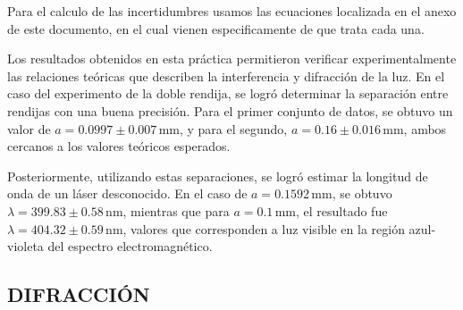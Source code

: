 \documentclass[article,12pt]{elsarticle}
\begin{document}
Para el calculo de las incertidumbres usamos las ecuaciones localizada en el anexo de este documento, en el cual vienen especificamente de que trata cada una.

Los resultados obtenidos en esta práctica permitieron verificar experimentalmente las relaciones teóricas que describen la interferencia y difracción de la luz. En el caso del experimento de la doble rendija, se logró determinar la separación entre rendijas con una buena precisión. Para el primer conjunto de datos, se obtuvo un valor de $a = 0.0997 \pm 0.007\, \text{mm}$, y para el segundo, $a = 0.16 \pm 0.016\, \text{mm}$, ambos cercanos a los valores teóricos esperados.

Posteriormente, utilizando estas separaciones, se logró estimar la longitud de onda de un láser desconocido. En el caso de $a = 0.1592\, \text{mm}$, se obtuvo $\lambda = 399.83 \pm 0.58\, \text{nm}$, mientras que para $a = 0.1\, \text{mm}$, el resultado fue $\lambda = 404.32 \pm 0.59\, \text{nm}$, valores que corresponden a luz visible en la región azul-violeta del espectro electromagnético.


\subsection{DIFRACCIÓN}

\begin{table}[H]
\centering
{}
\caption{Deducción del tamaño de rendija \( b \) a partir del patrón de difracción.}
\end{table}
\end{document}
